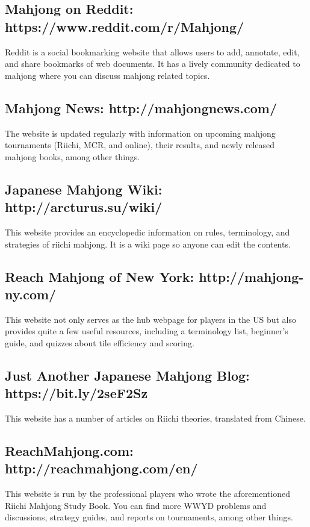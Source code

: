 \subsection*{Mahjong on Reddit: \textbf{https://www.reddit.com/r/Mahjong/}}
Reddit is a social bookmarking website that allows users to add, annotate, edit, and share bookmarks of web documents. It has a lively community dedicated to mahjong where you can discuss mahjong related topics. 

\subsection*{Mahjong News: \textbf{http://mahjongnews.com/}}
The website is updated regularly with information on upcoming mahjong tournaments (Riichi, MCR, and online), their results, and newly released mahjong books, among other things. 

\subsection*{Japanese Mahjong Wiki: \textbf{http://arcturus.su/wiki/}}
This website provides an encyclopedic information on rules, terminology, and strategies of riichi mahjong. It is a wiki page so anyone can edit the contents. 

\subsection*{Reach Mahjong of New York: \textbf{http://mahjong-ny.com/}}
This website not only serves as the hub webpage for players in the US but also provides quite a few useful resources, including a terminology list, beginner's guide, and quizzes about tile efficiency and scoring.

\subsection*{Just Another Japanese Mahjong Blog: \\\textbf{https://bit.ly/2seF2Sz}}
This website has a number of articles on Riichi theories, translated from Chinese. 

\subsection*{ReachMahjong.com: \textbf{http://reachmahjong.com/en/}}
This website is run by the professional players who wrote the aforementioned Riichi Mahjong Study Book. You can find more WWYD problems and discussions, strategy guides, and reports on tournaments, among other things. 

